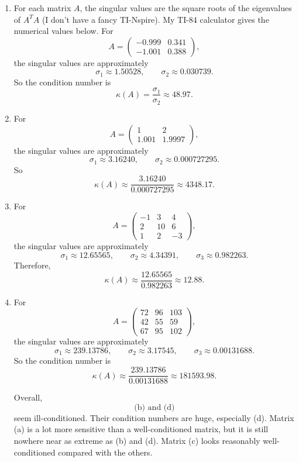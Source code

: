 \documentclass[10pt]{extarticle}
\begin{document}
\begin{enumerate}[label=(\alph*)]
\item For each matrix $A$, the singular values are the square roots of the eigenvalues of $A^TA$ (I don't have a fancy TI-Nspire). My TI-84 calculator gives the numerical values below. For
\[
A=
\begin{pmatrix}
-0.999 & 0.341\\
-1.001 & 0.388
\end{pmatrix},
\]
the singular values are approximately
\[
\sigma_1\approx 1.50528,
\qquad
\sigma_2\approx 0.030739.
\]
So the condition number is
\[
\kappa(A)=\frac{\sigma_1}{\sigma_2}\approx 48.97.
\]

\item For
\[
A=
\begin{pmatrix}
1 & 2\\
1.001 & 1.9997
\end{pmatrix},
\]
the singular values are approximately
\[
\sigma_1\approx 3.16240,
\qquad
\sigma_2\approx 0.000727295.
\]
So
\[
\kappa(A)\approx \frac{3.16240}{0.000727295}\approx 4348.17.
\]

\item For
\[
A=
\begin{pmatrix}
-1 & 3 & 4\\
2 & 10 & 6\\
1 & 2 & -3
\end{pmatrix},
\]
the singular values are approximately
\[
\sigma_1\approx 12.65565,
\qquad
\sigma_2\approx 4.34391,
\qquad
\sigma_3\approx 0.982263.
\]
Therefore,
\[
\kappa(A)\approx \frac{12.65565}{0.982263}\approx 12.88.
\]

\item For
\[
A=
\begin{pmatrix}
72 & 96 & 103\\
42 & 55 & 59\\
67 & 95 & 102
\end{pmatrix},
\]
the singular values are approximately
\[
\sigma_1\approx 239.13786,
\qquad
\sigma_2\approx 3.17545,
\qquad
\sigma_3\approx 0.00131688.
\]
So the condition number is
\[
\kappa(A)\approx \frac{239.13786}{0.00131688}\approx 181593.98.
\]

Overall,
\[
\text{(b) and (d)}
\]
seem ill-conditioned. Their condition numbers are huge, especially (d). Matrix (a) is a lot more sensitive than a well-conditioned matrix, but it is still nowhere near as extreme as (b) and (d). Matrix (c) looks reasonably well-conditioned compared with the others.
\end{enumerate}
\end{document}
